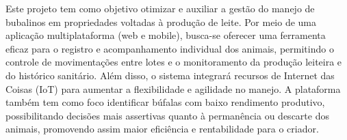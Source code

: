 Este projeto tem como objetivo otimizar e auxiliar a gestão do manejo de bubalinos em propriedades voltadas à produção de leite. Por meio de uma aplicação multiplataforma (web e mobile), busca-se oferecer uma ferramenta eficaz para o registro e acompanhamento individual dos animais, permitindo o controle de movimentações entre lotes e o monitoramento da produção leiteira e do histórico sanitário. Além disso, o sistema integrará recursos de Internet das Coisas (IoT) para aumentar a flexibilidade e agilidade no manejo. A plataforma também tem como foco identificar búfalas com baixo rendimento produtivo, possibilitando decisões mais assertivas quanto à permanência ou descarte dos animais, promovendo assim maior eficiência e rentabilidade para o criador.